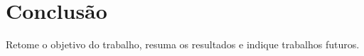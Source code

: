\chapter{Conclusão}
\label{cap:conclusao}

Retome o objetivo do trabalho, resuma os resultados e indique trabalhos futuros.

